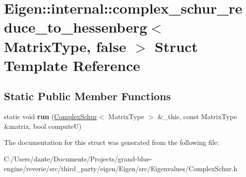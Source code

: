 \hypertarget{struct_eigen_1_1internal_1_1complex__schur__reduce__to__hessenberg_3_01_matrix_type_00_01false_01_4}{}\section{Eigen\+::internal\+::complex\+\_\+schur\+\_\+reduce\+\_\+to\+\_\+hessenberg$<$ Matrix\+Type, false $>$ Struct Template Reference}
\label{struct_eigen_1_1internal_1_1complex__schur__reduce__to__hessenberg_3_01_matrix_type_00_01false_01_4}
\subsection*{Static Public Member Functions}
\begin{DoxyCompactItemize}
\item 
\mbox{\label{struct_eigen_1_1internal_1_1complex__schur__reduce__to__hessenberg_3_01_matrix_type_00_01false_01_4_ac5afd1090b4ab0488035a861fc5c71a1}} 
static void {\bfseries run} (\mbox{\hyperlink{class_eigen_1_1_complex_schur}{Complex\+Schur}}$<$ Matrix\+Type $>$ \&\+\_\+this, const Matrix\+Type \&matrix, bool computeU)
\end{DoxyCompactItemize}


The documentation for this struct was generated from the following file\+:\begin{DoxyCompactItemize}
\item 
C\+:/\+Users/dante/\+Documents/\+Projects/grand-\/blue-\/engine/reverie/src/third\+\_\+party/eigen/\+Eigen/src/\+Eigenvalues/Complex\+Schur.\+h\end{DoxyCompactItemize}
